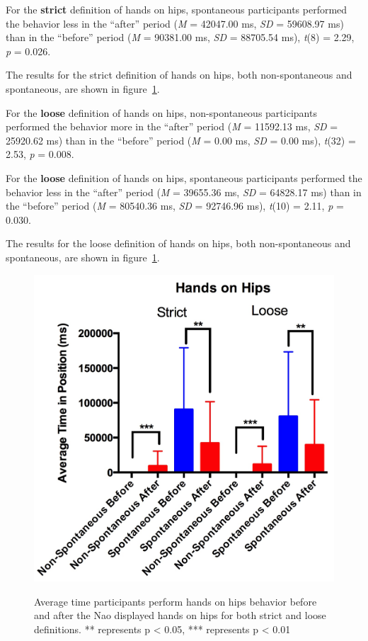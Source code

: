 \documentclass{acm_proc_article-sp}
\begin{document}
For the \textbf{strict} definition of hands on hips, spontaneous participants performed the behavior less in the ``after'' period (\textit{M} = 42047.00 ms, \textit{SD} = 59608.97 ms) than in the ``before'' period (\textit{M} = 90381.00 ms, \textit{SD} = 88705.54 ms), \textit{t}(8) = 2.29, \textit{p} = 0.026.

The results for the strict definition of hands on hips, both non-spontaneous and spontaneous, are shown in figure~\ref{hips}.

For the \textbf{loose} definition of hands on hips, non-spontaneous participants performed the behavior more in the ``after'' period (\textit{M} = 11592.13 ms, \textit{SD} = 25920.62 ms) than in the ``before'' period (\textit{M} = 0.00 ms, \textit{SD} = 0.00 ms), \textit{t}(32) = 2.53, \textit{p} = 0.008.

For the \textbf{loose} definition of hands on hips, spontaneous participants performed the behavior less in the ``after'' period (\textit{M} = 39655.36 ms, \textit{SD} = 64828.17 ms) than in the ``before'' period (\textit{M} = 80540.36 ms, \textit{SD} = 92746.96 ms), \textit{t}(10) = 2.11, \textit{p} = 0.030.

The results for the loose definition of hands on hips, both non-spontaneous and spontaneous, are shown in figure~\ref{hips}.

\begin{figure}[t!]
\centering
 \includegraphics[width=1.00\linewidth]{images/hips.jpg}\\
 \caption{Average time participants perform hands on hips behavior before and after the Nao displayed hands on hips for both strict and loose definitions. ** represents p < 0.05, *** represents p < 0.01} 
 \label{hips} %
\end{figure}
\end{document}
